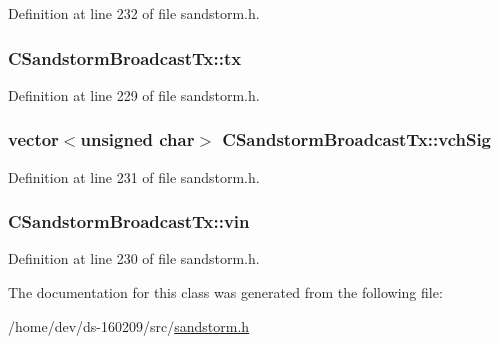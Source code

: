 Definition at line 232 of file sandstorm.\+h.

\hypertarget{class_c_sandstorm_broadcast_tx_ace6eee4d92b7fd4d98f8703d54d9b601}{}
\subsubsection[{tx}]{ C\+Sandstorm\+Broadcast\+Tx\+::tx}\label{class_c_sandstorm_broadcast_tx_ace6eee4d92b7fd4d98f8703d54d9b601}


Definition at line 229 of file sandstorm.\+h.

\hypertarget{class_c_sandstorm_broadcast_tx_ad75aca79f3783c7f1e3f6a58f5ddc737}{}
\subsubsection[{vch\+Sig}]{\setlength{\rightskip}{0pt plus 5cm}vector$<$unsigned char$>$ C\+Sandstorm\+Broadcast\+Tx\+::vch\+Sig}\label{class_c_sandstorm_broadcast_tx_ad75aca79f3783c7f1e3f6a58f5ddc737}


Definition at line 231 of file sandstorm.\+h.

\hypertarget{class_c_sandstorm_broadcast_tx_a7aa70aaddcdcc0a56c84f2a6e43e96bd}{}
\subsubsection[{vin}]{ C\+Sandstorm\+Broadcast\+Tx\+::vin}\label{class_c_sandstorm_broadcast_tx_a7aa70aaddcdcc0a56c84f2a6e43e96bd}


Definition at line 230 of file sandstorm.\+h.



The documentation for this class was generated from the following file\+:\begin{DoxyCompactItemize}
\item 
/home/dev/ds-\/160209/src/\hyperlink{sandstorm_8h}{sandstorm.\+h}\end{DoxyCompactItemize}
